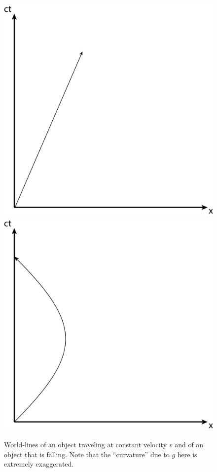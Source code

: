 \documentclass{book}
\theoremstyle{definition}
\begin{document}
\begin{figure}[h!]
	\centering
	\includegraphics[scale=0.15]{gr-fig-2a.png} 
	\includegraphics[scale=0.15]{gr-fig-2b.png}
	\caption{World-lines of an object traveling at constant velocity $v$ and of an object that is falling. Note that the ``curvature'' due to $g$ here is extremely exaggerated.}
\end{figure}
\end{document}
